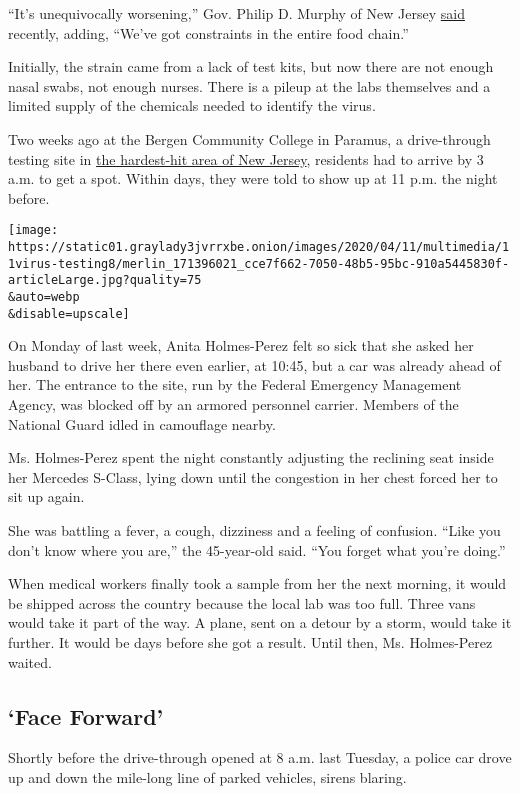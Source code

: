 ``It's unequivocally worsening,'' Gov. Philip D. Murphy of New Jersey
\href{https://www.nj.gov/governor/news/news/562020/approved/20200402d.shtml}{said}
recently, adding, ``We've got constraints in the entire food chain.''

Initially, the strain came from a lack of test kits, but now there are
not enough nasal swabs, not enough nurses. There is a pileup at the labs
themselves and a limited supply of the chemicals needed to identify the
virus.

Two weeks ago at the Bergen Community College in Paramus, a
drive-through testing site in
\href{https://www.nj.gov/health/cd/topics/covid2019_dashboard.shtml}{the
hardest-hit area of New Jersey}, residents had to arrive by 3 a.m. to
get a spot. Within days, they were told to show up at 11 p.m. the night
before.

\texttt{[image: https://static01.graylady3jvrrxbe.onion/images/2020/04/11/multimedia/11virus-testing8/merlin\_171396021\_cce7f662-7050-48b5-95bc-910a5445830f-articleLarge.jpg?quality=75\\\&auto=webp\\\&disable=upscale]}

On Monday of last week, Anita Holmes-Perez felt so sick that she asked
her husband to drive her there even earlier, at 10:45, but a car was
already ahead of her. The entrance to the site, run by the Federal
Emergency Management Agency, was blocked off by an armored personnel
carrier. Members of the National Guard idled in camouflage nearby.

Ms. Holmes-Perez spent the night constantly adjusting the reclining seat
inside her Mercedes S-Class, lying down until the congestion in her
chest forced her to sit up again.

She was battling a fever, a cough, dizziness and a feeling of confusion.
``Like you don't know where you are,'' the 45-year-old said. ``You
forget what you're doing.''

When medical workers finally took a sample from her the next morning, it
would be shipped across the country because the local lab was too full.
Three vans would take it part of the way. A plane, sent on a detour by a
storm, would take it further. It would be days before she got a result.
Until then, Ms. Holmes-Perez waited.

\hypertarget{face-forward}{%
\subsection{`Face Forward'}\label{face-forward}}

Shortly before the drive-through opened at 8 a.m. last Tuesday, a police
car drove up and down the mile-long line of parked vehicles, sirens
blaring.

